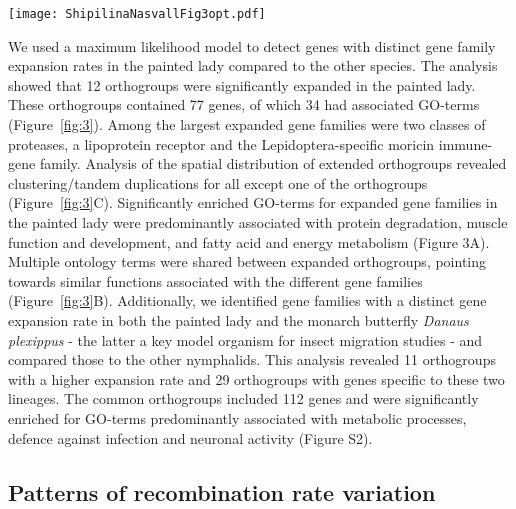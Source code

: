 \documentclass[twocolumn]{bmcart}%
\begin{document}
\begin{figure*}[tb]
    \centering
    \texttt{[image: ShipilinaNasvallFig3opt.pdf]}
    \caption{A) Significantly (p-value $<$ 0.05 after FDR-correction) enriched gene ontology (GO) terms associated with expanded gene families in the painted lady. The bars show the number of genes associated with each GO-term. The different GO-categories are biological process (BP), cellular compartment (CC) and molecular function (MF). B) Orthogroups with significantly enriched GO-terms. Shared GO terms between ontology terms (biological process category only) are shown in connecting lines. C) Spatial distribution of genes from extended orthogroups identified in BadiRate analysis.}
    \label{fig:3}
\end{figure*}

We used a maximum likelihood model to detect genes with distinct gene family expansion rates in the painted lady compared to the other species. The analysis showed that 12 orthogroups were significantly expanded in the painted lady. These orthogroups contained 77 genes, of which 34 had associated GO-terms (Figure~\ref{fig:3}). Among the largest expanded gene families were two classes of proteases, a lipoprotein receptor and the Lepidoptera-specific moricin immune-gene family. Analysis of the spatial distribution of extended orthogroups revealed clustering/tandem duplications for all except one of the orthogroups (Figure~\ref{fig:3}C). Significantly enriched GO-terms for expanded gene families in the painted lady were predominantly associated with protein degradation, muscle function and development, and fatty acid and energy metabolism (Figure 3A). Multiple ontology terms were shared between expanded orthogroups, pointing towards similar functions associated with the different gene families (Figure~\ref{fig:3}B). Additionally, we identified gene families with a distinct gene expansion rate in both the painted lady and the monarch butterfly \textit{Danaus plexippus} - the latter a key model organism for insect migration studies - and compared those to the other nymphalids. This analysis revealed 11 orthogroups with a higher expansion rate and 29 orthogroups with genes specific to these two lineages. The common orthogroups included 112 genes and were significantly enriched for GO-terms predominantly associated with metabolic processes, defence against infection and neuronal activity (Figure S2).

\subsection*{Patterns of recombination rate variation}
\end{document}
